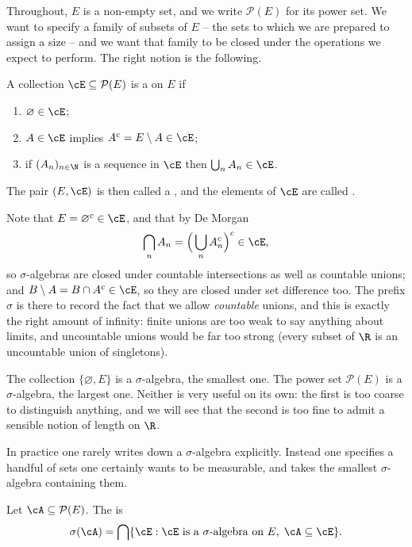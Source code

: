 Throughout, $E$ is a non-empty set, and we write $\mathcal{P}(E)$ for its power set. We want to specify a family of subsets of $E$ -- the sets to which we are prepared to assign a size -- and we want that family to be closed under the operations we expect to perform. The right notion is the following.

\begin{definition}
	A collection $\cE \subseteq \mathcal{P}(E)$ is a  on $E$ if
	\begin{enumerate}[label=(\roman*)]
		\item $\varnothing \in \cE$;
		\item $A \in \cE$ implies $A^c = E \setminus A \in \cE$;
		\item if $(A_n)_{n \in \N}$ is a sequence in $\cE$ then $\bigcup_{n} A_n \in \cE$.
	\end{enumerate}
	The pair $(E, \cE)$ is then called a , and the elements of $\cE$ are called .
\end{definition}

Note that $E = \varnothing^c \in \cE$, and that by De Morgan
$$
\bigcap_n A_n = \Big( \bigcup_n A_n^c \Big)^c \in \cE,
$$
so $\sigma$-algebras are closed under countable intersections as well as countable unions; and $B \setminus A = B \cap A^c \in \cE$, so they are closed under set difference too. The prefix $\sigma$ is there to record the fact that we allow \emph{countable} unions, and this is exactly the right amount of infinity: finite unions are too weak to say anything about limits, and uncountable unions would be far too strong (every subset of $\R$ is an uncountable union of singletons).

\begin{example}
	The collection $\{\varnothing, E\}$ is a $\sigma$-algebra, the smallest one. The power set $\mathcal{P}(E)$ is a $\sigma$-algebra, the largest one. Neither is very useful on its own: the first is too coarse to distinguish anything, and we will see that the second is too fine to admit a sensible notion of length on $\R$.
\end{example}

In practice one rarely writes down a $\sigma$-algebra explicitly. Instead one specifies a handful of sets one certainly wants to be measurable, and takes the smallest $\sigma$-algebra containing them.

\begin{definition}
	Let $\cA \subseteq \mathcal{P}(E)$. The  is
	$$
	\sigma(\cA) = \bigcap \{ \cE : \cE \text{ is a $\sigma$-algebra on } E, \; \cA \subseteq \cE \}.
	$$
\end{definition}

